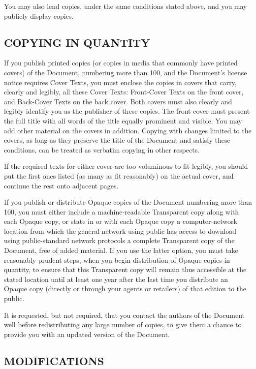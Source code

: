 \documentclass[a4paper,german,10pt,twoside]{book}
\begin{document}
{\begin{appendix}
{You may also lend copies, under the same conditions stated above, and you may publicly display
copies.


\subsection*{COPYING IN QUANTITY}
\label{copying}

If you publish printed copies (or copies in media that commonly have printed covers) of the
Document, numbering more than 100, and the Document's license notice requires Cover Texts, you must
enclose the copies in covers that carry, clearly and legibly, all these Cover Texts: Front-Cover
Texts on the front cover, and Back-Cover Texts on the back cover.  Both covers must also clearly
and legibly identify you as the publisher of these copies.	The front cover must present the full
title with all words of the title equally prominent and visible.  You may add other material on the
covers in addition. Copying with changes limited to the covers, as long as they preserve the title
of the Document and satisfy these conditions, can be treated as verbatim copying in other respects.

If the required texts for either cover are too voluminous to fit legibly, you should put the first
ones listed (as many as fit reasonably) on the actual cover, and continue the rest onto adjacent
pages.

If you publish or distribute Opaque copies of the Document numbering more than 100, you must either
include a machine-readable Transparent copy along with each Opaque copy, or state in or with each
Opaque copy a computer-network location from which the general network-using public has access to
download using public-standard network protocols a complete Transparent copy of the Document, free
of added material. If you use the latter option, you must take reasonably prudent steps, when you
begin distribution of Opaque copies in quantity, to ensure that this Transparent copy will remain
thus accessible at the stated location until at least one year after the last time you distribute
an Opaque copy (directly or through your agents or retailers) of that edition to the public.

It is requested, but not required, that you contact the authors of the Document well before
redistributing any large number of copies, to give them a chance to provide you with an updated
version of the Document.


\subsection*{MODIFICATIONS}
\label{modifications}

}
\end{appendix}}
\end{document}
